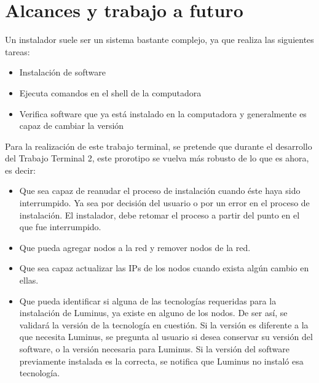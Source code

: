\section{Alcances y trabajo a futuro}
Un instalador suele ser un sistema bastante complejo, ya que realiza las siguientes tareas:\\
\begin{itemize}
 	\item Instalación de software\\
 	\item Ejecuta comandos en el shell de la computadora\\
 	\item Verifica software que ya está instalado en la computadora y generalmente es capaz de cambiar la versión\\
\end{itemize}
Para la realización de este trabajo terminal, se pretende que durante el desarrollo del Trabajo Terminal 2, este prorotipo se vuelva más robusto de lo que es ahora, es decir:\\
\begin{itemize}
	\item Que sea capaz de reanudar el proceso de instalación cuando éste haya sido interrumpido. Ya sea por decisión del usuario o por un error en el proceso de instalación. El instalador, debe retomar el proceso a partir del punto en el que fue interrumpido.\\
	\item Que pueda agregar nodos a la red y remover nodos de la red.\\
	\item Que sea capaz actualizar las IPs de los nodos cuando exista algún cambio en ellas.\\
	\item Que pueda identificar si alguna de las tecnologías requeridas para la instalación de Luminus, ya existe en alguno de los nodos. De ser así, se validará la versión de la tecnología en cuestión. Si la versión es diferente a la que necesita Luminus, se pregunta al usuario si desea conservar su versión del software, o la versión necesaria para Luminus. Si la versión del software previamente instalada es la correcta, se notifica que Luminus no instaló esa tecnología.\\
\end{itemize}